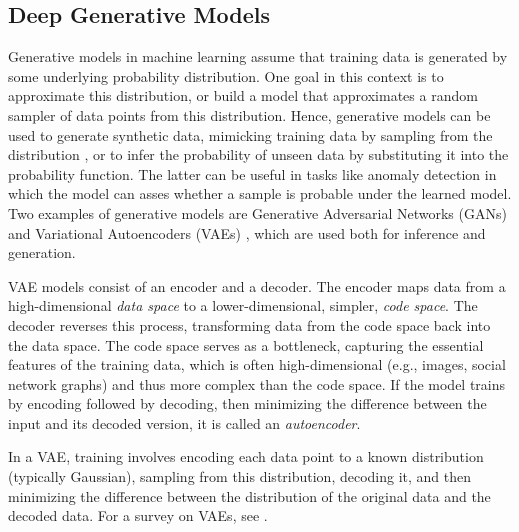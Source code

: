 \documentclass{article}
\theoremstyle{plain}
\theoremstyle{definition}
\theoremstyle{remark}
\newcommand{\ron}[1]{{{\textcolor{red}{\textbf{[Ron:} {#1}\textbf{]}}}}}
\begin{document}
\subsection{Deep Generative Models}
\label{extended_sec:generative_models}
Generative models in machine learning assume that training data is generated by some underlying probability distribution. One goal in this context is to approximate this distribution, or build a model that approximates a random sampler of data points from this distribution. Hence, generative models can be used to generate synthetic data, mimicking training data by sampling from the distribution 
\cite{harshvardhan2020comprehensive,dinh2016density,mohamed2016learning}, 
or to infer the probability of unseen data by substituting it into the probability function. 
The latter can be useful in tasks like anomaly detection \cite{pang2021anomalynotgraph} in which the model can asses whether a sample is probable under the learned model. 
Two examples of generative models are Generative Adversarial Networks (GANs) \cite{goodfellow2014gan,radford2015dcgan} and Variational Autoencoders (VAEs) \cite{kingma2013vae}, which are used both for inference and generation. 

VAE models consist of an encoder and a decoder. The encoder maps data from a high-dimensional \emph{data space} to a lower-dimensional, simpler, \emph{code space}. The decoder reverses this process, transforming data from the code space back into the data space. The code space serves as a bottleneck, capturing the essential features of the training data, which is often high-dimensional (e.g., images, social network graphs) and thus more complex than the code space. If the model trains by encoding followed by decoding, then minimizing the difference between the input and its decoded version, it is called an \emph{autoencoder}.

In a VAE, training involves encoding each data point to a known distribution (typically Gaussian), sampling from this distribution, decoding it, and then minimizing the difference between the distribution of the original data and the decoded data. For a survey on VAEs, see \cite{tschannen2018vaesurvay}. 

\end{document}
